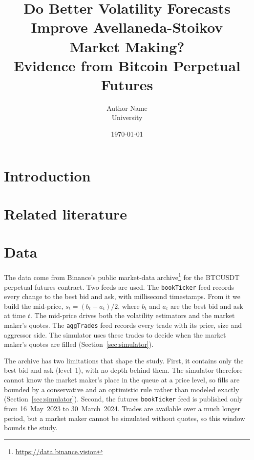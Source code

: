 \documentclass[11pt]{article}
\title{Do Better Volatility Forecasts Improve Avellaneda-Stoikov Market Making?\\
       Evidence from Bitcoin Perpetual Futures}
\author{Author Name\\ University}
\date{\today}
\begin{document}
\maketitle

\begin{abstract}
\end{abstract}

\section{Introduction}
\label{sec:intro}

\section{Related literature}
\label{sec:literature}

\section{Data}
\label{sec:data}
The data come from Binance's public market-data archive\footnote{\url{https://data.binance.vision}}
for the BTCUSDT perpetual futures contract. Two feeds are used. The \texttt{bookTicker} feed records
every change to the best bid and ask, with millisecond timestamps. From it we build the mid-price,
$s_t = (b_t + a_t)/2$, where $b_t$ and $a_t$ are the best bid and ask at time $t$. The mid-price drives both the volatility estimators and the market maker's quotes. The
\texttt{aggTrades} feed records every trade with its price, size and aggressor side. The simulator uses
these trades to decide when the market maker's quotes are filled (Section~\ref{sec:simulator}).

The archive has two limitations that shape the study. First, it contains only the best bid and ask
(level~1), with no depth behind them. The simulator therefore cannot know the market maker's place in the
queue at a price level, so fills are bounded by a conservative and an optimistic rule rather than modeled
exactly (Section~\ref{sec:simulator}). Second, the futures \texttt{bookTicker} feed is published only from
16~May~2023 to 30~March~2024. Trades are available over a much longer period, but a market maker cannot
be simulated without quotes, so this window bounds the study.
\end{document}
